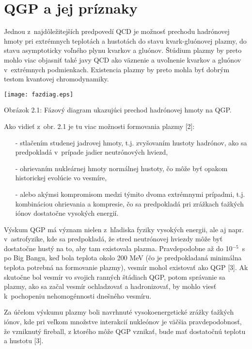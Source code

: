 \chapter{QGP a jej príznaky}
Jednou z~najdôležitejších predpovedí QCD je možnosť
prechodu hadrónovej hmo\-ty pri extrémnych teplotách a hustotách
do stavu kvark-gluónovej plazmy, do stavu asymptoticky voľného
plynu kvarkov a gluónov. Štúdium plazmy by preto mohlo viac
objasniť také javy QCD ako väznenie a uvoľnenie
kvarkov  a gluónov v~extrémnych podmienkach. Existencia
plazmy by preto mohla byť dobrým testom kvantovej chromodynamiky.

\begin{center}
  \texttt{[image: fazdiag.eps]}
\end{center}

\begin{center}
  Obrázok 2.1: Fázový diagram ukazujúci prechod hadrónovej hmoty na QGP.
\end{center}
\newpage
Ako vidieť z~obr. 2.1 je tu viac možnosti formovania plazmy [2]:

\begin{itemize}
\item[-] stlačením studenej jadrovej hmoty, t.j. zvyšovaním
  hustoty hadrónov, ako sa predpokladá  v~prípade  jadier neutrónových
  hviezd,
\item[-] ohrievaním nukleárnej hmoty normálnej hustoty,  čo
  môže byť opakom historickej  evolúcie vo vesmíre,
\item[-] alebo akýmsi kompromisom medzi týmito dvoma extrémnymi
  prípadmi, t.j. kombináciou ohrievania a kompresie, čo sa
  predpokladá pri zrážkach ťažkých iónov dostatočne vysokých
  energií.
\end{itemize}

Výskum QGP má význam nielen z~hľadiska fyziky vysokých energii,
ale aj napr. v~astrofyzike, kde sa predpokladá, že stred neutrónovej
hviezdy môže  byť dostatočne hustý na to, aby tam existovala
plazma. Pravdepodobne až do 10$^{-5}$~s po Big Bangu, keď bola
teplota okolo 200 MeV (čo je predpokladaná minimálna teplota
potrebná na formovanie plazmy), vesmír mohol existovať ako QGP
[3]. Ak  skutočne bol vesmír vo svojich ranných
štádiach QGP, potom správanie sa  plazmy, ako sa začal vesmír
ochladzovať a hadronizovať, by mohlo viesť  k~pochopeniu
nehomogénnosti dnešného vesmíru.

Za účelom výskumu plazmy boli navrhnuté vysokoenergetické
zrážky ťažkých  iónov, kde pri veľkom
množstve interakcií nukleónov je väčšia pravdepodobnosť,
že vzniknutý  fireball, z ktorého môže QGP vznikať, bude mať
dostatočnú teplotu a hustotu [3].


